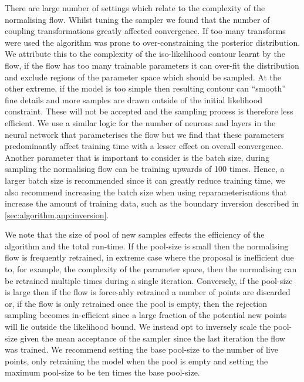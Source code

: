 \documentclass[%
 reprint,
nofootinbib,
 amsmath,amssymb,
 aps,
 prd,
]{revtex4-2}
\begin{document}
There are large number of settings which relate to the complexity of the normalising flow. Whilst tuning the sampler we found that the number of coupling transformations greatly affected convergence. If too many transforms were used the algorithm was prone to over-constraining the posterior distribution. We attribute this to the complexity of the iso-likelihood contour learnt by the flow, if the flow has too many trainable parameters it can over-fit the distribution and exclude regions of the parameter space which should be sampled. At the other extreme, if the model is too simple then resulting contour can ``smooth'' fine details and more samples are drawn outside of the initial likelihood constraint. These will not be accepted and the sampling process is therefore less efficient. We use a similar logic for the number of neurons and layers in the neural network that parameterises the flow but we find that these parameters predominantly affect training time with a lesser effect on overall convergence. Another parameter that is important to consider is the batch size, during sampling the normalising flow can be training upwards of 100 times. Hence, a larger batch size is recommended since it can greatly reduce training time, we also recommend increasing the batch size when using reparameterisations that increase the amount of training data, such as the boundary inversion described in \cref{sec:algorithm,app:inversion}.

We note that the size of pool of new samples effects the efficiency of the algorithm and the total run-time. If the pool-size is small then the normalising flow is frequently retrained, in extreme case where the proposal is inefficient due to, for example, the complexity of the parameter space, then the normalising can be retrained multiple times during a single iteration. Conversely, if the pool-size is large then if the flow is force-ably retrained a number of points are discarded or, if the flow is only retrained once the pool is empty, then the rejection sampling becomes in-efficient since a large fraction of the potential new points will lie outside the likelihood bound. We instead opt to inversely scale the pool-size given the mean acceptance of the sampler since the last iteration the flow was trained. We recommend setting the base pool-size to the number of live points, only retraining the model when the pool is empty and setting the maximum pool-size to be ten times the base pool-size.
\end{document}
